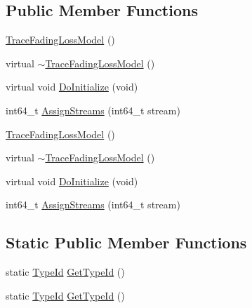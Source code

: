 \subsection*{Public Member Functions}
\begin{DoxyCompactItemize}
\item 
\hyperlink{classns3_1_1TraceFadingLossModel_a9b94d034c7753a1dad2a5718009f593f}{Trace\+Fading\+Loss\+Model} ()
\item 
virtual \hyperlink{classns3_1_1TraceFadingLossModel_a780bc7009a8732e0417989dc92e78b36}{$\sim$\+Trace\+Fading\+Loss\+Model} ()
\item 
virtual void \hyperlink{classns3_1_1TraceFadingLossModel_ae1981fdafc20dfe852841fac07626c30}{Do\+Initialize} (void)
\item 
int64\+\_\+t \hyperlink{classns3_1_1TraceFadingLossModel_aeed70747119f4543690cda81cd2e18ce}{Assign\+Streams} (int64\+\_\+t stream)
\item 
\hyperlink{classns3_1_1TraceFadingLossModel_a9b94d034c7753a1dad2a5718009f593f}{Trace\+Fading\+Loss\+Model} ()
\item 
virtual \hyperlink{classns3_1_1TraceFadingLossModel_a30389b4436aa1dfc55f5b816f12ab6e3}{$\sim$\+Trace\+Fading\+Loss\+Model} ()
\item 
virtual void \hyperlink{classns3_1_1TraceFadingLossModel_a6cb2673036f0f848f2d5cee655fbec3c}{Do\+Initialize} (void)
\item 
int64\+\_\+t \hyperlink{classns3_1_1TraceFadingLossModel_aeed70747119f4543690cda81cd2e18ce}{Assign\+Streams} (int64\+\_\+t stream)
\end{DoxyCompactItemize}
\subsection*{Static Public Member Functions}
\begin{DoxyCompactItemize}
\item 
static \hyperlink{classns3_1_1TypeId}{Type\+Id} \hyperlink{classns3_1_1TraceFadingLossModel_aa8fe58808a0d3b226bf0b18142cdc918}{Get\+Type\+Id} ()
\item 
static \hyperlink{classns3_1_1TypeId}{Type\+Id} \hyperlink{classns3_1_1TraceFadingLossModel_a3284607f809c42a795d37ed9dceed201}{Get\+Type\+Id} ()
\end{DoxyCompactItemize}
